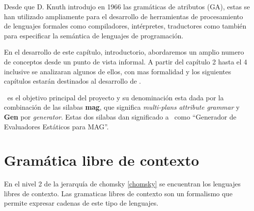 Desde que D. Knuth introdujo en 1966 las gramáticas de atributos (GA), estas se han utilizado ampliamente para el desarrollo de herramientas de procesamiento de lenguajes formales como compiladores, intérpretes, traductores como también para especificar la semántica de lenguajes de programación.

En el desarrollo de este capítulo, introductorio, abordaremos un amplio numero de conceptos desde un punto de vista informal. A partir del capítulo 2 hasta el 4 inclusive se analizaran algunos de ellos, con mas formalidad y los siguientes capítulos estarán destinados al desarrollo de \maggen. 

\maggen\ es el objetivo principal del proyecto y su denominación esta dada por la combinación de las silabas \textbf{mag}, que significa \textit{multi-plans attribute grammar} y \textbf{Gen} por \textit{generator}. Estas dos silabas dan significado a \maggen\ como ``Generador de Evaluadores Estáticos para MAG''.

\section{Gramática libre de contexto}
En el nivel 2 de la jerarquía de chomsky \ref{chomsky} se encuentran los lenguajes libres de contexto. Las gramaticas libres de contexto son un formalismo que permite expresar cadenas de este tipo de lenguajes.

